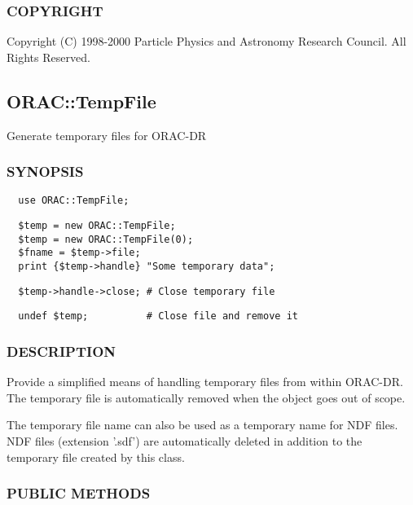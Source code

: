 \subsubsection*{COPYRIGHT\label{ORAC::Print_COPYRIGHT}}

Copyright (C) 1998-2000 Particle Physics and Astronomy Research
Council. All Rights Reserved.

\subsection{ORAC::TempFile\label{ORAC::TempFile}}

Generate temporary files for ORAC-DR

\subsubsection*{SYNOPSIS\label{ORAC::TempFile_SYNOPSIS}}\begin{verbatim}
  use ORAC::TempFile;
\end{verbatim}
\begin{verbatim}
  $temp = new ORAC::TempFile;
  $temp = new ORAC::TempFile(0);
  $fname = $temp->file;
  print {$temp->handle} "Some temporary data";
\end{verbatim}
\begin{verbatim}
  $temp->handle->close; # Close temporary file
\end{verbatim}
\begin{verbatim}
  undef $temp;          # Close file and remove it
\end{verbatim}
\subsubsection*{DESCRIPTION\label{ORAC::TempFile_DESCRIPTION}}

Provide a simplified means of handling temporary files from within
ORAC-DR. The temporary file is automatically removed when the
object goes out of scope.



The temporary file name can also be used as a temporary name for
NDF files. NDF files (extension '.sdf') are automatically deleted
in addition to the temporary file created by this class.

\subsubsection*{PUBLIC METHODS\label{ORAC::TempFile_PUBLIC_METHODS}}

